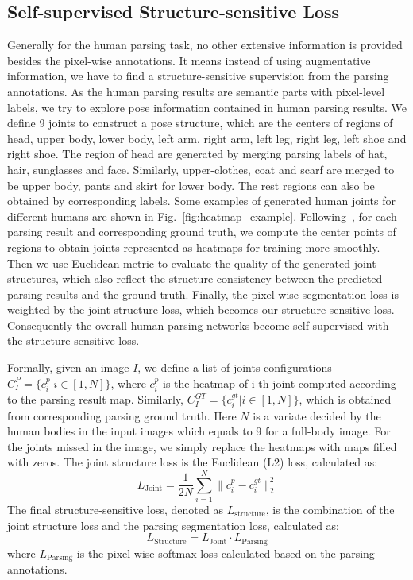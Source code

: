 \documentclass[10pt,twocolumn,letterpaper]{article}
\begin{document}
\subsection{Self-supervised Structure-sensitive Loss}
Generally for the human parsing task, no other extensive information is provided besides the pixel-wise annotations. It means instead of using augmentative information, we have to find a structure-sensitive supervision from the parsing annotations. As the human parsing results are semantic parts with pixel-level labels, we try to explore pose information contained in human parsing results. We define 9 joints to construct a pose structure, which are the centers of regions of head, upper body, lower body, left arm, right arm, left leg, right leg, left shoe and right shoe. The region of head are generated by merging parsing labels of hat, hair, sunglasses and face. Similarly, upper-clothes, coat and scarf are merged to be upper body, pants and skirt for lower body. The rest regions can also be obtained by corresponding labels. Some examples of generated human joints for different humans are shown in Fig.~\ref{fig:heatmap_example}. Following~\cite{Pfister15a}, for each parsing result and corresponding ground truth, we compute the center points of regions to obtain joints represented as heatmaps for training more smoothly. Then we use Euclidean metric to evaluate the quality of the generated joint structures, which also reflect the structure consistency between the predicted parsing results and the ground truth. Finally, the pixel-wise segmentation loss is weighted by the joint structure loss, which becomes our structure-sensitive loss. Consequently the overall human parsing networks become self-supervised with the structure-sensitive loss. 

Formally, given an image $I$, we define a list of joints configurations $C^{P}_I = \{c^{p}_i|i\in[1,N]\}$, where $c^{p}_i$ is the heatmap of i-th joint computed according to the parsing result map. Similarly, $C^{GT}_I = \{c^{gt}_i|i\in[1,N]\}$, which is obtained from corresponding parsing ground truth. Here $N$ is a variate decided by the human bodies in the input images which equals to 9 for a full-body image. For the joints missed in the image, we simply replace the heatmaps with maps filled with zeros. The joint structure loss is the Euclidean (L2) loss, calculated as:
\vspace{-4mm}
\begin{equation}
L_{\text{Joint}} = \frac{1}{2N} \sum \limits_{i=1}^N \| c^{p}_i - c_i^{gt} \|_2^2
\end{equation}
\vspace{-1mm}
The final structure-sensitive loss, denoted as $L_{\text{structure}}$, is the combination of the joint structure loss and the parsing segmentation loss, calculated as:
\vspace{-1mm}
\begin{equation}
L_{\text{Structure}} = L_{\text{Joint}} \cdot L_{\text{Parsing}}
\end{equation}
\vspace{-1mm}
where $L_{\text{Parsing}}$ is the pixel-wise softmax loss calculated based on the parsing annotations.
\end{document}
